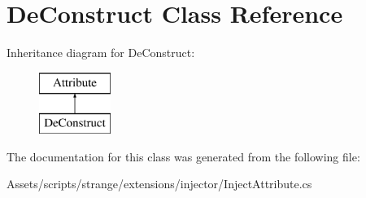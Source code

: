 \hypertarget{class_de_construct}{\section{De\-Construct Class Reference}
\label{class_de_construct}
}
Inheritance diagram for De\-Construct\-:\begin{figure}[H]
\begin{center}
\leavevmode
\includegraphics[height=2.000000cm]{class_de_construct}
\end{center}
\end{figure}


The documentation for this class was generated from the following file\-:\begin{DoxyCompactItemize}
\item 
Assets/scripts/strange/extensions/injector/Inject\-Attribute.\-cs\end{DoxyCompactItemize}
